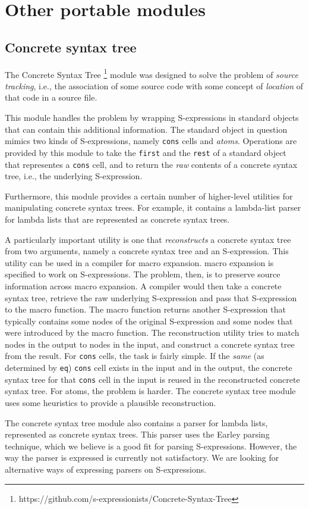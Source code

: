 \chapter{Other portable modules}

\section{Concrete syntax tree}
\label{sec-concrete-syntax-tree}

The Concrete Syntax Tree%
\footnote{https://github.com/s-expressionists/Concrete-Syntax-Tree}
module was designed to solve the problem of \emph{source tracking},
i.e., the association of some source code with some concept of
\emph{location} of that code in a source file.

This module handles the problem by wrapping S-expressions in standard
objects that can contain this additional information.  The standard
object in question mimics two kinds of S-expressions, namely
\texttt{cons} cells and \emph{atoms}.  Operations are provided by this
module to take the \texttt{first} and the \texttt{rest} of a standard
object that representes a \texttt{cons} cell, and to return the
\emph{raw} contents of a concrete syntax tree, i.e., the underlying
S-expression.

Furthermore, this module provides a certain number of higher-level
utilities for manipulating concrete syntax trees.  For example, it
contains a lambda-list parser for lambda lists that are represented as
concrete syntax trees.

A particularly important utility is one that \emph{reconstructs} a
concrete syntax tree from two arguments, namely a concrete syntax tree
and an S-expression.  This utility can be used in a compiler for macro
expansion.  \commonlisp{} macro expansion is specified to work on
S-expressions.  The problem, then, is to preserve source information
across macro expansion.  A compiler would then take a concrete syntax
tree, retrieve the raw underlying S-expression and pass that
S-expression to the macro function.  The macro function returns
another S-expression that typically contains some nodes of the
original S-expression and some nodes that were introduced by the macro
function.  The reconstruction utility tries to match nodes in the
output to nodes in the input, and construct a concrete syntax tree
from the result.  For \texttt{cons} cells, the task is fairly simple.
If the \emph{same} (as determined by \texttt{eq}) \texttt{cons} cell
exists in the input and in the output, the concrete syntax tree for
that \texttt{cons} cell in the input is reused in the reconstructed
concrete syntax tree.  For atoms, the problem is harder.  The concrete
syntax tree module uses some heuristics to provide a plausible
reconstruction.

The concrete syntax tree module also contains a parser for lambda
lists, represented as concrete syntax trees.  This parser uses the
Earley parsing technique, which we believe is a good fit for parsing
S-expressions.  However, the way the parser is expressed is currently
not satisfactory.  We are looking for alternative ways of expressing
parsers on S-expressions.
